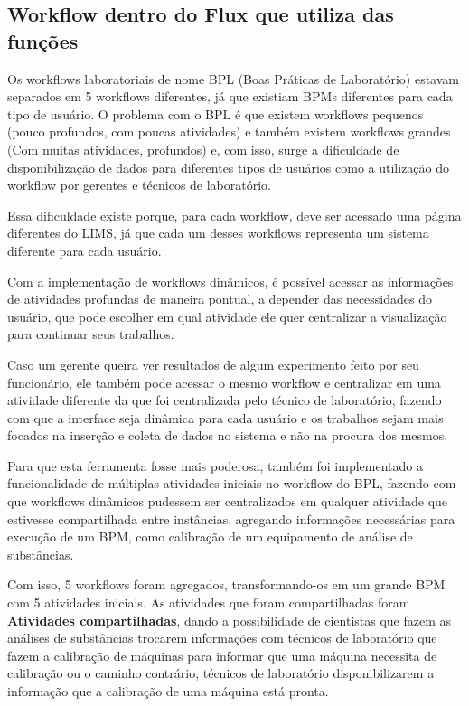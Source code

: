 \subsection{Workflow dentro do Flux que utiliza das funções}

Os workflows laboratoriais de nome BPL (Boas Práticas de Laboratório) estavam separados em 5 workflows diferentes, já que existiam BPMs diferentes para cada tipo de usuário.
O problema com o BPL é que existem workflows pequenos (pouco profundos, com poucas atividades) e também existem workflows grandes (Com muitas atividades, profundos) e, com isso, surge a dificuldade de disponibilização de dados para diferentes tipos de usuários como a utilização do workflow por gerentes e técnicos de laboratório.

Essa dificuldade existe porque, para cada workflow, deve ser acessado uma página diferentes do LIMS, já que cada um desses workflows representa um sistema diferente para cada usuário.

Com a implementação de workflows dinâmicos, é possível acessar as informações de atividades profundas de maneira pontual, a depender das necessidades do usuário, que pode escolher em qual atividade ele quer centralizar a visualização para continuar seus trabalhos.

Caso um gerente queira ver resultados de algum experimento feito por seu funcionário, ele também pode acessar o mesmo workflow e centralizar em uma atividade diferente da que foi centralizada pelo técnico de laboratório, fazendo com que a interface seja dinâmica para cada usuário e os trabalhos sejam mais focados na inserção e coleta de dados no sistema e não na procura dos mesmos.

Para que esta ferramenta fosse mais poderosa, também foi implementado a funcionalidade de múltiplas atividades iniciais no workflow do BPL, fazendo com que workflows dinâmicos pudessem ser centralizados em qualquer atividade que estivesse compartilhada entre instâncias, agregando informações necessárias para execução de um BPM, como calibração de um equipamento de análise de substâncias.

Com isso, 5 workflows foram agregados, transformando-os em um grande BPM com 5 atividades iniciais. As atividades que foram compartilhadas foram \textbf{Atividades compartilhadas}, dando a possibilidade de cientistas que fazem as análises de substâncias trocarem informações com técnicos de laboratório que fazem a calibração de máquinas para informar que uma máquina necessita de calibração ou o caminho contrário, técnicos de laboratório disponibilizarem a informação que a calibração de uma máquina está pronta.